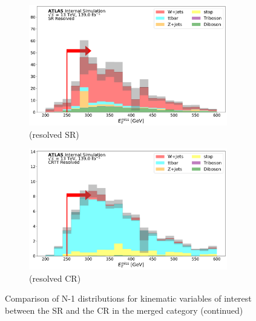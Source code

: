 \begin{figure}[htbp]
    \begin{subfigure}{0.45\textwidth}
     \includegraphics[width = 0.95\textwidth]{Figures/App_SR_CR_distributions/SR1L_Resolved/MetTST_met_N_1.pdf}
    \caption{\met (resolved SR)}
     \end{subfigure}
    \begin{subfigure}{0.45\textwidth}
     \includegraphics[width = 0.95\textwidth]{Figures/App_SR_CR_distributions/CRTT_Resolved/MetTST_met_N_1.pdf}
     \caption{\met (resolved \ttbar CR)}
     \end{subfigure}

     \caption{Comparison of N-1 distributions for kinematic variables of interest between the SR and the \ttbar CR in the merged category (continued)}
  \end{figure}
  
  \captionsetup[figure]{list=yes}

